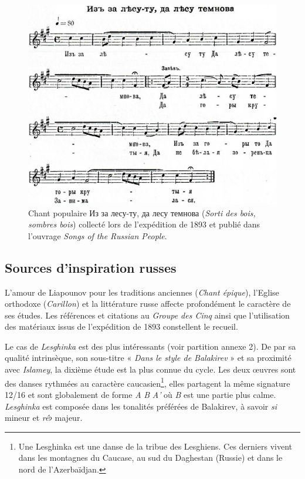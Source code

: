 \begin{figure}[!ht]
  \begin{bigcenter}
    \includegraphics[width=12.75cm, keepaspectratio]{woods.png}
  \end{bigcenter}
  \caption{\label{woods}Chant populaire \foreignlanguage{russian}{Из за лесу-ту, да лесу темнова} (\emph{Sorti des bois, sombres bois}) collecté lors de l'expédition de 1893 et publié dans l'ouvrage \emph{Songs of the Russian People}.}
\end{figure}

\subsection{Sources d'inspiration russes}

L'amour de Liapounov pour les traditions anciennes (\emph{Chant épique}), l'Eglise orthodoxe (\emph{Carillon}) et la littérature russe affecte profondément le caractère de ses études. Les références et citations au \emph{Groupe des Cinq} ainsi que l'utilisation des matériaux issus de l'expédition de 1893 constellent le recueil. 

Le cas de \emph{Lesghinka} est des plus intéressants (voir partition annexe 2). De par sa qualité intrinsèque, son sous-titre « \emph{Dans le style de Balakirev} » et sa proximité avec \emph{Islamey}, la dixième étude est la plus connue du cycle. Les deux œuvres sont des danses rythmées au caractère caucasien\footnote{Une Lesghinka est une danse de la tribue des Lesghiens. Ces derniers vivent dans les montagnes du Caucase, au sud du Daghestan (Russie) et dans le nord de l'Azerbaïdjan.}, elles partagent la même signature 12/16 et sont globalement de forme \emph{A} \emph{B} \emph{A'} où \emph{B} est une partie plus calme. \emph{Lesghinka} est composée dans les tonalités préférées de Balakirev, à savoir \emph{si} mineur et \emph{ré}$\flat$ majeur.

